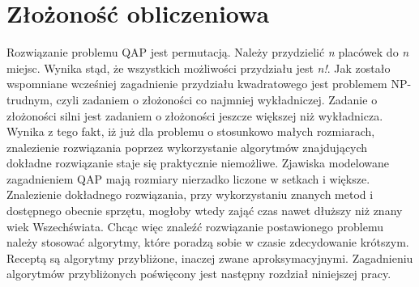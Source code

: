 \section{Złożoność obliczeniowa}
Rozwiązanie problemu QAP jest permutacją. Należy przydzielić \textit{n} placówek do \textit{n} miejsc. Wynika stąd, że wszystkich możliwości przydziału jest \textit{n!}. Jak zostało wspomniane wcześniej zagadnienie przydziału kwadratowego jest problemem NP-trudnym, czyli zadaniem o złożoności co najmniej wykładniczej. Zadanie o złożoności silni jest zadaniem o złożoności jeszcze większej niż wykładnicza. Wynika z tego fakt, iż już dla problemu o stosunkowo małych rozmiarach, znalezienie rozwiązania poprzez wykorzystanie algorytmów znajdujących dokładne rozwiązanie staje się praktycznie niemożliwe. Zjawiska modelowane zagadnieniem QAP mają rozmiary nierzadko liczone w setkach i większe. Znalezienie dokładnego rozwiązania, przy wykorzystaniu znanych metod i dostępnego obecnie sprzętu, mogłoby wtedy zająć czas nawet dłuższy niż znany wiek Wszechświata. Chcąc więc znaleźć rozwiązanie postawionego problemu należy stosować algorytmy, które poradzą sobie w czasie zdecydowanie krótszym. Receptą są algorytmy przybliżone, inaczej zwane aproksymacyjnymi. Zagadnieniu algorytmów przybliżonych poświęcony jest następny rozdział niniejszej pracy.